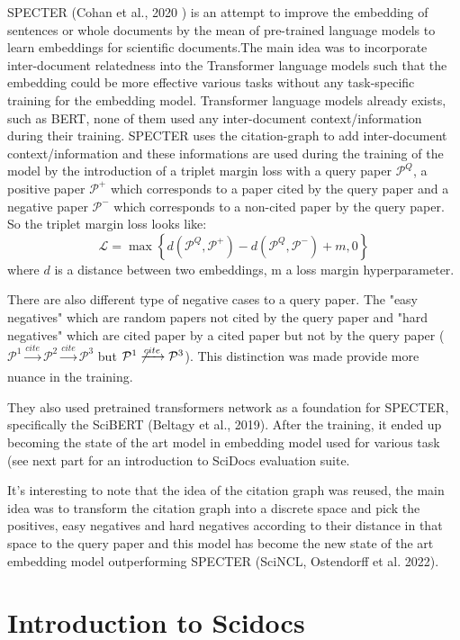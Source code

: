 \documentclass[conference]{IEEEtran}
\begin{document}
SPECTER (Cohan et al., 2020 \cite{b1}) is an attempt to improve the embedding of sentences or whole documents by the mean of pre-trained language models to learn embeddings for scientific documents.The main idea was to incorporate inter-document relatedness into the Transformer language models such that the embedding could be more effective various tasks without any task-specific training for the embedding model. Transformer language models already exists, such as BERT, none of them used any inter-document context/information during their training. SPECTER uses the citation-graph to add inter-document context/information and these informations are used during the training of the model by the introduction of a triplet margin loss with a query paper $\mathcal P^Q$, a positive paper $\mathcal P^+$ which corresponds to a paper cited by the query paper and a negative paper $\mathcal P^-$ which corresponds to a non-cited paper by the query paper. So the triplet margin loss looks like: $$\mathcal L = \max\left\{d\left(\mathcal P^Q, \mathcal P^+\right) - d\left(\mathcal P^Q, \mathcal P^-\right) + m, 0\right\}$$ where $d$ is a distance between two embeddings, m a loss margin hyperparameter.

There are also different type of negative cases to a query paper. The "easy negatives" which are random papers not cited by the query paper and "hard negatives" which are cited paper by a cited paper but not by the query paper ($\mathcal P^1 \xrightarrow[]{cite} \mathcal P^2 \xrightarrow[]{cite}\mathcal P^3$ but $\mathcal P^1\not\xrightarrow[]{cite} \mathcal P^3$). This distinction was made provide more nuance in the training. 

They also used pretrained transformers network as a foundation for SPECTER, specifically the SciBERT (Beltagy et al., 2019\cite{b3}). After the training, it ended up becoming the state of the art model in embedding model used for various task (see next part for an introduction to SciDocs evaluation suite.

It's interesting to note that the idea of the citation graph was reused, the main idea was to transform the citation graph into a discrete space and pick the positives, easy negatives and hard negatives according to their distance in that space to the query paper and this model has become the new state of the art embedding model outperforming SPECTER (SciNCL, Ostendorff et al. 2022\cite{b2}).

\section{Introduction to Scidocs}
\end{document}

